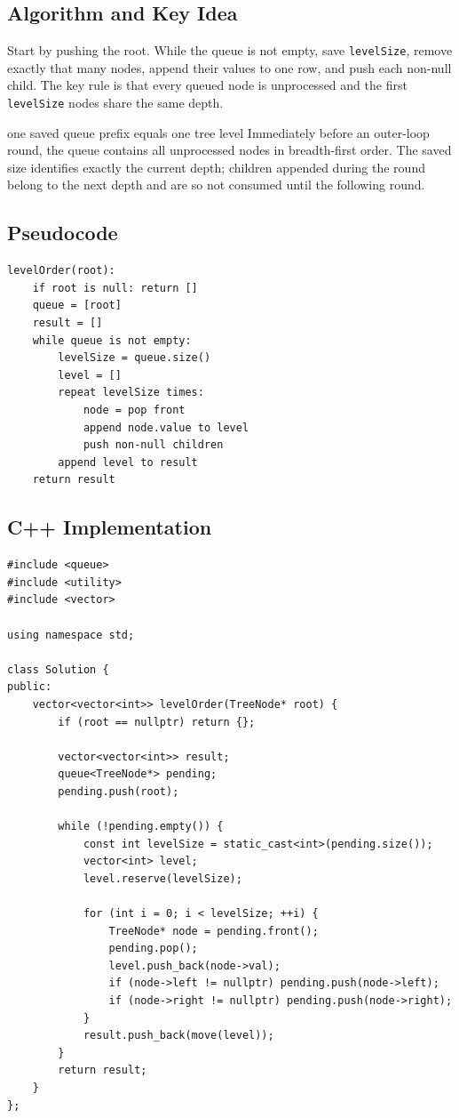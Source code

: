 \subsection{Algorithm and Key Idea}
Start by pushing the root. While the queue is not empty, save
\texttt{levelSize}, remove exactly that many nodes, append their values to one
row, and push each non-null child. The key rule is that every queued node is
unprocessed and the first \texttt{levelSize} nodes share the same depth.

\begin{invariantbox}{one saved queue prefix equals one tree level}
Immediately before an outer-loop round, the queue contains all unprocessed
nodes in breadth-first order. The saved size identifies exactly the current
depth; children appended during the round belong to the next depth and are
so not consumed until the following round.
\end{invariantbox}

\subsection{Pseudocode}
\begin{lstlisting}[style=pseudocode]
levelOrder(root):
    if root is null: return []
    queue = [root]
    result = []
    while queue is not empty:
        levelSize = queue.size()
        level = []
        repeat levelSize times:
            node = pop front
            append node.value to level
            push non-null children
        append level to result
    return result
\end{lstlisting}

\subsection{C++ Implementation}
\begin{lstlisting}[style=compactcode,caption={Complete C++ solution: Binary Tree Level Order Traversal}]
#include <queue>
#include <utility>
#include <vector>

using namespace std;

class Solution {
public:
    vector<vector<int>> levelOrder(TreeNode* root) {
        if (root == nullptr) return {};

        vector<vector<int>> result;
        queue<TreeNode*> pending;
        pending.push(root);

        while (!pending.empty()) {
            const int levelSize = static_cast<int>(pending.size());
            vector<int> level;
            level.reserve(levelSize);

            for (int i = 0; i < levelSize; ++i) {
                TreeNode* node = pending.front();
                pending.pop();
                level.push_back(node->val);
                if (node->left != nullptr) pending.push(node->left);
                if (node->right != nullptr) pending.push(node->right);
            }
            result.push_back(move(level));
        }
        return result;
    }
};
\end{lstlisting}

